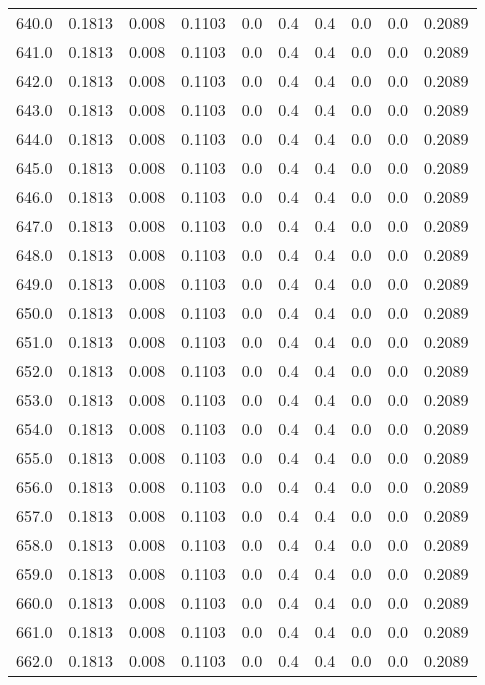 \begin{longtable}{lrrrrrrrrr}
640.0 & 0.1813 & 0.008 & 0.1103 & 0.0 & 0.4 & 0.4 & 0.0 & 0.0 & 0.2089 \\
641.0 & 0.1813 & 0.008 & 0.1103 & 0.0 & 0.4 & 0.4 & 0.0 & 0.0 & 0.2089 \\
642.0 & 0.1813 & 0.008 & 0.1103 & 0.0 & 0.4 & 0.4 & 0.0 & 0.0 & 0.2089 \\
643.0 & 0.1813 & 0.008 & 0.1103 & 0.0 & 0.4 & 0.4 & 0.0 & 0.0 & 0.2089 \\
644.0 & 0.1813 & 0.008 & 0.1103 & 0.0 & 0.4 & 0.4 & 0.0 & 0.0 & 0.2089 \\
645.0 & 0.1813 & 0.008 & 0.1103 & 0.0 & 0.4 & 0.4 & 0.0 & 0.0 & 0.2089 \\
646.0 & 0.1813 & 0.008 & 0.1103 & 0.0 & 0.4 & 0.4 & 0.0 & 0.0 & 0.2089 \\
647.0 & 0.1813 & 0.008 & 0.1103 & 0.0 & 0.4 & 0.4 & 0.0 & 0.0 & 0.2089 \\
648.0 & 0.1813 & 0.008 & 0.1103 & 0.0 & 0.4 & 0.4 & 0.0 & 0.0 & 0.2089 \\
649.0 & 0.1813 & 0.008 & 0.1103 & 0.0 & 0.4 & 0.4 & 0.0 & 0.0 & 0.2089 \\
650.0 & 0.1813 & 0.008 & 0.1103 & 0.0 & 0.4 & 0.4 & 0.0 & 0.0 & 0.2089 \\
651.0 & 0.1813 & 0.008 & 0.1103 & 0.0 & 0.4 & 0.4 & 0.0 & 0.0 & 0.2089 \\
652.0 & 0.1813 & 0.008 & 0.1103 & 0.0 & 0.4 & 0.4 & 0.0 & 0.0 & 0.2089 \\
653.0 & 0.1813 & 0.008 & 0.1103 & 0.0 & 0.4 & 0.4 & 0.0 & 0.0 & 0.2089 \\
654.0 & 0.1813 & 0.008 & 0.1103 & 0.0 & 0.4 & 0.4 & 0.0 & 0.0 & 0.2089 \\
655.0 & 0.1813 & 0.008 & 0.1103 & 0.0 & 0.4 & 0.4 & 0.0 & 0.0 & 0.2089 \\
656.0 & 0.1813 & 0.008 & 0.1103 & 0.0 & 0.4 & 0.4 & 0.0 & 0.0 & 0.2089 \\
657.0 & 0.1813 & 0.008 & 0.1103 & 0.0 & 0.4 & 0.4 & 0.0 & 0.0 & 0.2089 \\
658.0 & 0.1813 & 0.008 & 0.1103 & 0.0 & 0.4 & 0.4 & 0.0 & 0.0 & 0.2089 \\
659.0 & 0.1813 & 0.008 & 0.1103 & 0.0 & 0.4 & 0.4 & 0.0 & 0.0 & 0.2089 \\
660.0 & 0.1813 & 0.008 & 0.1103 & 0.0 & 0.4 & 0.4 & 0.0 & 0.0 & 0.2089 \\
661.0 & 0.1813 & 0.008 & 0.1103 & 0.0 & 0.4 & 0.4 & 0.0 & 0.0 & 0.2089 \\
662.0 & 0.1813 & 0.008 & 0.1103 & 0.0 & 0.4 & 0.4 & 0.0 & 0.0 & 0.2089 \\

\end{longtable}
